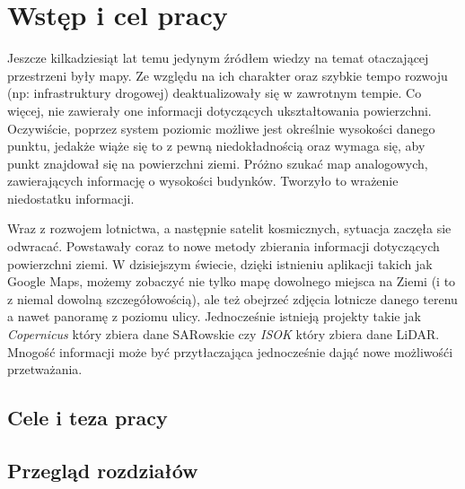 \chapter{Wst\k{e}p i cel pracy}

Jeszcze kilkadziesiąt lat temu jedynym źródłem wiedzy na temat otaczającej przestrzeni były mapy.
Ze względu na ich charakter oraz szybkie tempo rozwoju (np: infrastruktury drogowej) deaktualizowały
się w zawrotnym tempie. Co więcej, nie zawierały one informacji dotyczących ukształtowania powierzchni.
Oczywiście, poprzez system poziomic możliwe jest określnie wysokości danego punktu, jedakże wiąże się to
z pewną niedokładnością oraz wymaga się, aby punkt znajdował się na powierzchni ziemi. Próżno szukać
map analogowych, zawierających informację o wysokości budynków. Tworzyło to wrażenie niedostatku informacji.

Wraz z rozwojem lotnictwa, a następnie satelit kosmicznych, sytuacja zaczęła sie odwracać. Powstawały coraz to
nowe metody zbierania informacji dotyczących powierzchni ziemi. W dzisiejszym świecie, dzięki istnieniu aplikacji
takich jak Google Maps, możemy zobaczyć nie tylko mapę dowolnego miejsca na Ziemi (i to z niemal dowolną szczegółowością),
ale też obejrzeć zdjęcia lotnicze danego terenu a nawet panoramę z poziomu ulicy. Jednocześnie istnieją projekty takie jak
\textit{Copernicus}\cite{webiste:copernicus} który zbiera dane SARowskie czy \textit{ISOK}\cite{website:isok} który zbiera
dane LiDAR. Mnogość informacji może być przytłaczająca jednocześnie dająć nowe możliwośći przetważania.

\section{Cele i teza pracy}

\section{Przegląd rozdziałów}
